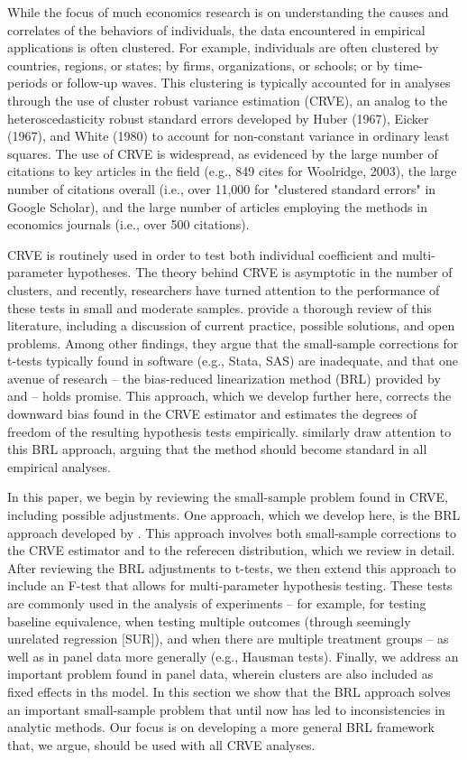 \documentclass[12pt]{article}
\begin{document}
While the focus of much economics research is on understanding the causes and correlates of the behaviors of individuals, the data encountered in empirical applications is often clustered. For example, individuals are often clustered by countries, regions, or states; by firms, organizations, or schools; or by time-periods or follow-up waves. This clustering is typically accounted for in analyses through the use of cluster robust variance estimation (CRVE), an analog to the heteroscedasticity robust standard errors developed by Huber (1967), Eicker (1967), and White (1980) to account for non-constant variance in ordinary least squares. The use of CRVE is widespread, as evidenced by the large number of citations to key articles in the field (e.g., 849 cites for Woolridge, 2003), the large number of citations overall (i.e., over 11,000 for "clustered standard errors" in Google Scholar), and the large number of articles employing the methods in economics journals (i.e., over 500 citations). 

CRVE is routinely used in order to test both individual coefficient and multi-parameter hypotheses. The theory behind CRVE is asymptotic in the number of clusters, and recently, researchers have turned attention to the performance of these tests in small and moderate samples. \citet{Cameron2015practitioners} provide a thorough review of this literature, including a discussion of current practice, possible solutions, and open problems. Among other findings, they argue that the small-sample corrections for t-tests typically found in software (e.g., Stata, SAS) are inadequate, and that one avenue of research -- the bias-reduced linearization method (BRL) provided by \citet{Bell2002bias} and \citet{McCaffrey2001generalizations} -- holds promise. This approach, which we develop further here, corrects the downward bias found in the CRVE estimator and estimates the degrees of freedom of the resulting hypothesis tests empirically. \citet{Imbens2012robust} similarly draw attention to this BRL approach, arguing that the method should become standard in all empirical analyses.

In this paper, we begin by reviewing the small-sample problem found in CRVE, including possible adjustments. One approach, which we develop here, is the BRL approach developed by \citet{Bell2002bias}. This approach involves both small-sample corrections to the CRVE estimator and to the referecen distribution, which we review in detail. After reviewing the BRL adjustments to t-tests, we then extend this approach to include an F-test that allows for multi-parameter hypothesis testing. These tests are commonly used in the analysis of experiments -- for example, for testing baseline equivalence, when testing multiple outcomes (through seemingly unrelated regression [SUR]), and when there are multiple treatment groups -- as well as in panel data more generally (e.g., Hausman tests). Finally, we address an important problem found in panel data, wherein clusters are also included as fixed effects in ths model. In this section we show that the BRL approach solves an important small-sample problem that until now has led to inconsistencies in analytic methods. Our focus is on developing a more general BRL framework that, we argue, should be used with all CRVE analyses.
\end{document}

